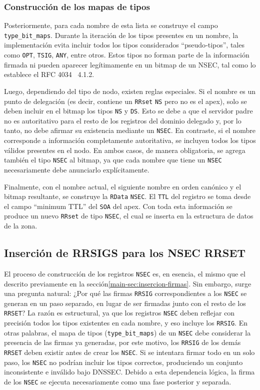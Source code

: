 \subsubsection{Construcción de los mapas de tipos}

Posteriormente, para cada nombre de esta lista se construye el campo \texttt{type\_bit\_maps}. 
Durante la iteración de los tipos presentes en un nombre, la implementación evita incluir todos los tipos considerados “pseudo‐tipos”, tales como \texttt{OPT}, \texttt{TSIG}, \texttt{ANY}, 
entre otros. Estos tipos no forman parte de la información firmada ni pueden aparecer legítimamente en un bitmap de un NSEC, tal como lo establece el RFC 4034~\cite{RFC4034} 4.1.2. 

Luego, dependiendo del tipo de nodo, existen reglas especiales. Si el nombre es un punto de delegación (es decir, contiene un \texttt{RRset} \texttt{NS} pero no es el apex), solo se deben incluir en el 
bitmap los tipos \texttt{NS} y \texttt{DS}. Esto se debe a que el servidor padre no es autoritativo para el resto de los registros del dominio delegado y, 
por lo tanto, no debe afirmar su existencia mediante un \texttt{NSEC}. En contraste, si el nombre corresponde a información completamente autoritativa, se incluyen todos los tipos válidos 
presentes en el nodo. En ambos casos, de manera obligatoria, se agrega también el tipo \texttt{NSEC} al bitmap, ya que cada nombre que tiene un \texttt{NSEC} necesariamente debe anunciarlo 
explícitamente.


Finalmente, con el nombre actual, el siguiente nombre en orden canónico y el bitmap resultante, se construye la \texttt{RData} \texttt{NSEC}. El \texttt{TTL} del registro se 
toma desde el campo “minimum TTL” del \texttt{SOA} del apex. Con toda esta información se produce un nuevo \texttt{RRset} de tipo \texttt{NSEC}, 
el cual se inserta en la estructura de datos de la zona.

\subsection{Inserción de RRSIGS para los NSEC RRSET}

El proceso de construcción de los registros \texttt{NSEC} es, en esencia, el mismo que el descrito previamente en la sección\ref{main-sec:insercion-firmas}.
Sin embargo, surge una pregunta natural: ¿Por qué las firmas \texttt{RRSIG} correspondientes a los \texttt{NSEC} se generan en un paso separado, en lugar de ser firmadas junto con el resto de 
los \texttt{RRSET}? La razón es estructural, ya que los registros \texttt{NSEC} deben reflejar con precisión todos los tipos existentes en cada nombre, y eso incluye los \texttt{RRSIG}. 
En otras palabras, el mapa de tipos (\texttt{type\_bit\_maps}) de un \texttt{NSEC} debe considerar la presencia de las firmas ya generadas, por este motivo, los \texttt{RRSIG} de los demás 
\texttt{RRSET} deben existir antes de crear los \texttt{NSEC}. Si se intentara firmar todo en un solo paso, los \texttt{NSEC} no podrían incluir los tipos correctos, produciendo un conjunto 
inconsistente e inválido bajo DNSSEC. Debido a esta dependencia lógica, la firma de los \texttt{NSEC} se ejecuta necesariamente como una fase posterior y separada.

